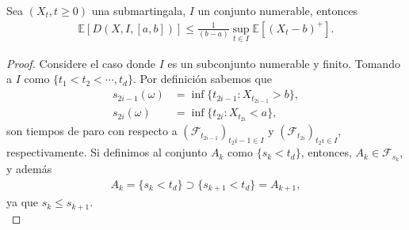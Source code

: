 \begin{proposition}
	Sea $(X_t, t \geq 0)$ una submartingala, $I$ un conjunto numerable, entonces
    \begin{align*}
		\mathbb{E} \left[ D(X, I, [a, b]) \right] \leq \frac{1}{(b-a)} \sup_{t \in I} \mathbb{E} \left[ (X_t - b)^{+} \right].
	\end{align*}
\end{proposition}
\begin{proof}
	Considere el caso donde $I$ es un subconjunto numerable y finito. Tomando a $I$ como $\{t_1 < t_2 < \cdots, t_d\}$. Por definición sabemos que
    \begin{align*}
		s_{2i-1} (\omega) & = \inf \{ t_{2i-1} : X_{t_{2i-1}} > b \}, \\
        s_{2i} (\omega) & = \inf \{ t_{2i} : X_{t_{2i}} < a \},
	\end{align*}
son tiempos de paro con respecto a $(\mathcal{F}_{t_{2i-1}})_{t{_2i-1} \in I}$ y $(\mathcal{F}_{t_{2i}})_{t{_2i} \in I}$, respectivamente. Si definimos al conjunto $A_k$ como $\{ s_k < t_d \}$, entonces, $A_k \in \mathcal{F}_{s_k}$, y además
	\begin{align*}
		A_k = \{ s_k < t_d \} \supset \{ s_{k+1} < t_d \} = A_{k+1},
	\end{align*}
ya que $s_k \leq s_{k+1}$. \\


\end{proof}
